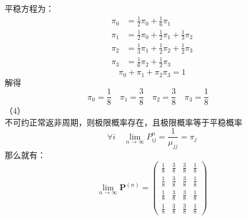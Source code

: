 \documentclass[UTF8]{ctexart}
\begin{document}
平稳方程为：
$$
\begin{aligned}
	\pi_0&=\frac{1}{2}\pi_0+\frac{1}{6}\pi_1\\
	\pi_1&=\frac{1}{2}\pi_0+\frac{1}{2}\pi_1+\frac{1}{3}\pi_2\\
	\pi_2&=\frac{1}{3}\pi_1+\frac{1}{2}\pi_2+\frac{1}{2}\pi_3\\
	\pi_3&=\frac{1}{6}\pi_2+\frac{1}{2}\pi_3
\end{aligned}
$$
\[
\pi_0+\pi_1+\pi_2\pi_3=1
\]
解得
\[
\pi_0=\frac{1}{8} \quad \pi_1=\frac{3}{8} \quad \pi_2=\frac{3}{8} \quad \pi_3=\frac{1}{8} \quad
\]
（4）\\
不可约正常返非周期，则极限概率存在，且极限概率等于平稳概率\\
\[
\forall i \quad \lim_{n\rightarrow \infty} P_{ij}^n=\frac{1}{\mu_{jj}}=\pi_j
\]
那么就有：
\[
\lim _{n \rightarrow \infty} \mathbf{P}^{(n)}=
\begin{pmatrix}
	\frac{1}{8} &\frac{3}{8}&\frac{3}{8}&\frac{1}{8}\\
	\frac{1}{8} &\frac{3}{8}&\frac{3}{8}&\frac{1}{8}\\
	\frac{1}{8} &\frac{3}{8}&\frac{3}{8}&\frac{1}{8}\\
	\frac{1}{8} &\frac{3}{8}&\frac{3}{8}&\frac{1}{8}
\end{pmatrix}
\]\\
\end{document}

